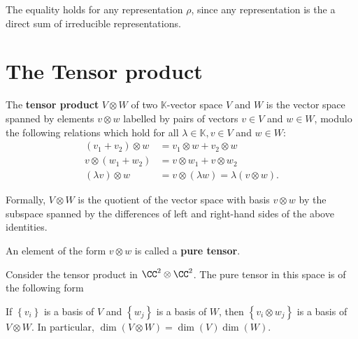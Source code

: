 \documentclass[12pt, a4paper]{article}
\newcommand{\KK}{\mathbb{K}}
\begin{document}
\begin{mdnote}
    The equality holds for any representation \(\rho\), since any representation is the a direct sum of irreducible representations.
\end{mdnote}

\section{The Tensor product}

\begin{definition}
    The \textbf{tensor product} \(V \otimes W\) of two \(\KK\)-vector space \(V\) and \(W\) is the vector space spanned by elements \(v\otimes w\) labelled by pairs of vectors \(v\in V\) and \(w\in W\), modulo the following relations which hold for all \(\lambda \in \KK, v\in V\) and \(w\in W\):
    \[\begin{aligned}
        (v_1 +v_2)\otimes w &= v_1 \otimes w+v_2\otimes w \\
        v\otimes (w_1+w_2) &=v\otimes w_1+ v\otimes w_2 \\
        (\lambda v) \otimes w &= v\otimes (\lambda w) = \lambda (v\otimes w).
    \end{aligned}\]
\end{definition}

\begin{mdremark}
    Formally, \(V \otimes W\) is the quotient of the vector space with basis \(v\otimes w\) by the subspace spanned by the differences of left and right-hand sides of the above identities.
\end{mdremark}

\begin{definition}
    An element of the form \(v\otimes w\) is called a \textbf{pure tensor}.
\end{definition}

\begin{mdexample}
    Consider the tensor product in \(\CC^2 \otimes \CC^2\). The pure tensor in this space is of the following form  
\end{mdexample}

\begin{mdprop}
    If \(\left\{ v_i \right\}\) is a basis of \(V\) and \(\left\{ w_j \right\}\) is a basis of \(W\), then \(\left\{ v_i \otimes w_j \right\}\) is a basis of \(V \otimes W\). In particular, \(\dim(V \otimes W) =\dim(V)\dim(W)\).
\end{mdprop}
\end{document}
